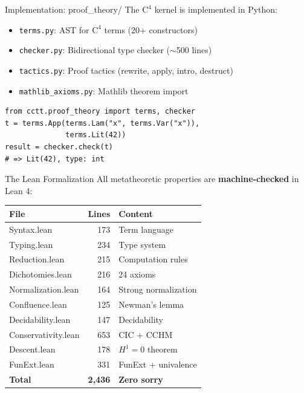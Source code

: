 \documentclass[aspectratio=169,11pt]{beamer}
\newcommand{\Cfour}{\mathrm{C}^4}
\begin{document}
\begin{frame}{Implementation: proof\_theory/}
The $\Cfour$ kernel is implemented in Python:

\begin{itemize}
\item \texttt{terms.py}: AST for $\Cfour$ terms (20+ constructors)
\item \texttt{checker.py}: Bidirectional type checker ($\sim$500 lines)
\item \texttt{tactics.py}: Proof tactics (rewrite, apply, intro, destruct)
\item \texttt{mathlib\_axioms.py}: Mathlib theorem import
\end{itemize}

\vspace{0.5em}
\begin{lstlisting}[language=deppy, basicstyle=\small\ttfamily]
from cctt.proof_theory import terms, checker
t = terms.App(terms.Lam("x", terms.Var("x")),
              terms.Lit(42))
result = checker.check(t)
# => Lit(42), type: int
\end{lstlisting}
\end{frame}

\begin{frame}{The Lean Formalization}
All metatheoretic properties are \textbf{machine-checked} in Lean 4:

\vspace{0.5em}
\begin{center}
\begin{tabular}{lrl}
\toprule
\textbf{File} & \textbf{Lines} & \textbf{Content} \\
\midrule
Syntax.lean & 173 & Term language \\
Typing.lean & 234 & Type system \\
Reduction.lean & 215 & Computation rules \\
Dichotomies.lean & 216 & 24 axioms \\
Normalization.lean & 164 & Strong normalization \\
Confluence.lean & 125 & Newman's lemma \\
Decidability.lean & 147 & Decidability \\
Conservativity.lean & 653 & CIC + CCHM \\
Descent.lean & 178 & $H^1 = 0$ theorem \\
FunExt.lean & 331 & FunExt + univalence \\
\midrule
\textbf{Total} & \textbf{2,436} & \textbf{Zero sorry} \\
\bottomrule
\end{tabular}
\end{center}
\end{frame}
\end{document}
